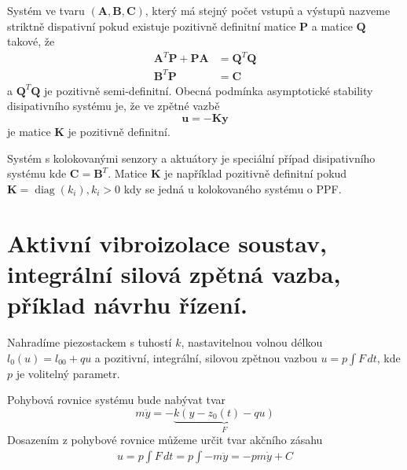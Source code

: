 \documentclass{article}
\begin{document}


	Systém ve tvaru $(\bm{A}, \bm{B}, \bm{C})$, který má stejný počet vstupů a výstupů nazveme striktně dispativní pokud existuje pozitivně definitní matice $\bm{P}$ a matice $\bm{Q}$ takové, že
	\begin{align}
		\bm{A}^T\bm{P} + \bm{P}\bm{A} &= \bm{Q}^T\bm{Q} \\
		\bm{B}^T\bm{P} &= \bm{C}
	\end{align}
	a $\bm{Q}^T\bm{Q}$ je pozitivně semi-definitní. Obecná podmínka asymptotické stability disipativního systému je, že ve zpětné vazbě
	\begin{equation}
		\bm{u}=-\bm{K}\bm{y}
	\end{equation}
	je matice $\bm{K}$ je pozitivně definitní.

	Systém s kolokovanými senzory a aktuátory je speciální případ disipativního systému kde $\bm{C}=\bm{B}^{T}$. Matice $\bm{K}$ je například pozitivně definitní pokud $\bm{K}=\operatorname{diag}\left(k_i\right), k_i>0$ kdy se jedná u kolokovaného systému o PPF.


	\pagebreak
	\section{Aktivní vibroizolace soustav, integrální silová zpětná vazba, příklad návrhu řízení.}

	Nahradíme piezostackem s tuhostí $k$, nastavitelnou volnou délkou $l_0(u) = l_{00} + qu$ a pozitivní, integrální, silovou zpětnou vazbou $u = p \int F\,dt$, kde $p$ je volitelný parametr.

	Pohybová rovnice systému bude nabývat tvar
	\begin{equation}
		m\ddot{y} = - \underbrace{k ( y-z_0(t)-qu)}_{F}
	\end{equation}
	Dosazením z pohybové rovnice můžeme určit tvar akčního zásahu
	\begin{align}
		u = p \int F\,dt = p \int -m\ddot{y} = -pm\dot{y} + C
	\end{align}
\end{document}
